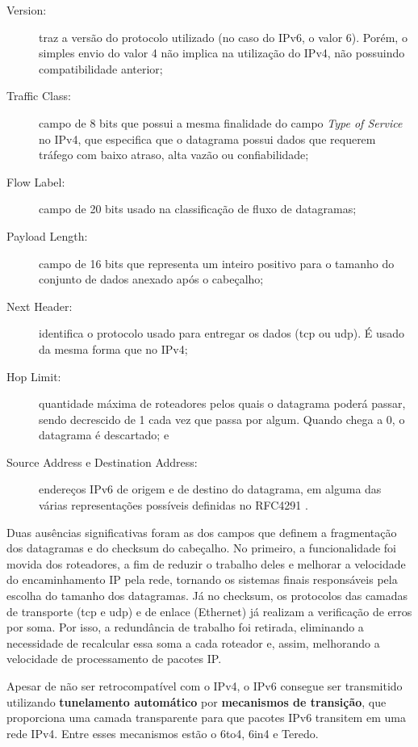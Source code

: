 \begin{description}
    \item[Version:] traz a versão do protocolo utilizado (no caso do IPv6, o valor 6).
        Porém, o simples envio do valor 4 não implica na utilização do IPv4, não
        possuindo compatibilidade anterior;

    \item[Traffic Class:] campo de 8 bits que possui a mesma finalidade do campo
        \emph{Type of Service} no IPv4, que especifica que o datagrama possui dados que
        requerem tráfego com baixo atraso, alta vazão ou confiabilidade;

    \item[Flow Label:] campo de 20 bits usado na classificação de fluxo de datagramas;

    \item[Payload Length:] campo de 16 bits que representa um inteiro positivo para o
        tamanho do conjunto de dados anexado após o cabeçalho;

    \item[Next Header:] identifica o protocolo usado para entregar os dados (\gls{tcp}
        ou \gls*{udp}). É usado da mesma forma que no IPv4;

    \item[Hop Limit:] quantidade máxima de roteadores pelos quais o datagrama poderá
        passar, sendo decrescido de 1 cada vez que passa por algum. Quando chega a 0, o
        datagrama é descartado; e

    \item[Source Address e Destination Address:] endereços IPv6 de origem e de destino
        do datagrama, em alguma das várias representações possíveis definidas no RFC4291
        \cite{site:rfcipv6add}.
\end{description}

Duas ausências significativas foram as dos campos que definem a fragmentação dos
datagramas e do \gls{checksum} do cabeçalho. No primeiro, a funcionalidade foi movida
dos roteadores, a fim de reduzir o trabalho deles e melhorar a velocidade do
encaminhamento IP pela rede, tornando os sistemas finais responsáveis pela escolha do
tamanho dos datagramas. Já no \gls*{checksum}, os protocolos das camadas de transporte
(\gls*{tcp} e \gls*{udp}) e de enlace (Ethernet) já realizam a verificação de erros por
soma. Por isso, a redundância de trabalho foi retirada, eliminando a necessidade de
recalcular essa soma a cada roteador e, assim, melhorando a velocidade de processamento
de pacotes IP.

Apesar de não ser retrocompatível com o IPv4, o IPv6 consegue ser transmitido utilizando
\textbf{tunelamento automático} por \textbf{mecanismos de transição}, que proporciona
uma camada transparente para que pacotes IPv6 transitem em uma rede IPv4. Entre esses
mecanismos estão o 6to4, 6in4 e Teredo.

